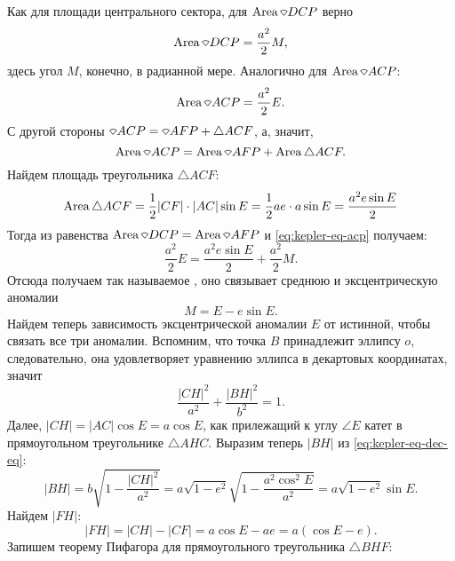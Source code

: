 Как для площади центрального сектора, для $\area \sector DCP$ верно
\begin{equation*}
    \area \sector DCP = \frac{a^2}{2} M,
\end{equation*}
здесь угол $M$, конечно, в радианной мере. Аналогично для $\area \sector ACP$:
\begin{equation*}
    \area \sector ACP = \frac{a^2}{2} E.
\end{equation*}
С другой стороны $\sector ACP = \sector AFP + \triangle ACF$, а, значит,
\begin{equation}
    \area \sector ACP = \area\sector AFP + \area\triangle ACF.
    \label{eq:kepler-eq-acp}
\end{equation}
Найдем площадь треугольника $\triangle ACF$:
\begin{equation*}
    \operatorname{Area} \triangle ACF = \frac{1}{2} |CF| \cdot |AC| \sin E = \frac{1}{2} a e \cdot a \sin E =  \frac{a^2 e\sin E}{2}
\end{equation*}
Тогда из равенства $\area \sector DCP = \area \sector AFP$ и \eqref{eq:kepler-eq-acp} получаем:
\begin{equation*}
    \frac{a^2}{2} E = \frac{a^2 e\sin E}{2} + \frac{a^2}{2} M.
\end{equation*}
Отсюда получаем так называемое , оно связывает среднюю и эксцентрическую аномалии
\begin{equation}\label{eq:kepler-eq}
    M = E - e \sin E.
\end{equation}
Найдем теперь зависимость эксцентрической аномалии $E$ от истинной, чтобы связать все три аномалии. Вспомним, что точка $B$ принадлежит эллипсу $o$, следовательно, она удовлетворяет уравнению эллипса в декартовых координатах, значит
\begin{equation}
    \frac{|CH|^2}{a^2} + \frac{|BH|^2}{b^2} = 1.
    \label{eq:kepler-eq-dec-eq}
\end{equation}
Далее, $|CH| = |AC| \cos E = a \cos E$, как прилежащий к углу $\angle E$ катет в прямоугольном треугольнике $\triangle AHC$. Выразим теперь $|BH|$ из \eqref{eq:kepler-eq-dec-eq}:
\begin{equation*}
    |BH| = b\sqrt{1 - \frac{|CH|^2}{a^2}} = a \sqrt{1 - e^2} \sqrt{1 - \frac{a^2 \cos^2 E}{a^2}} = a \sqrt{1 - e^2} \sin E .
\end{equation*}
Найдем $|FH|$:
\begin{equation*}
    |FH| = |CH| - |CF| = a \cos E - a e = a (\cos E - e).
\end{equation*}
Запишем теорему Пифагора для прямоугольного треугольника $\triangle BHF$:
